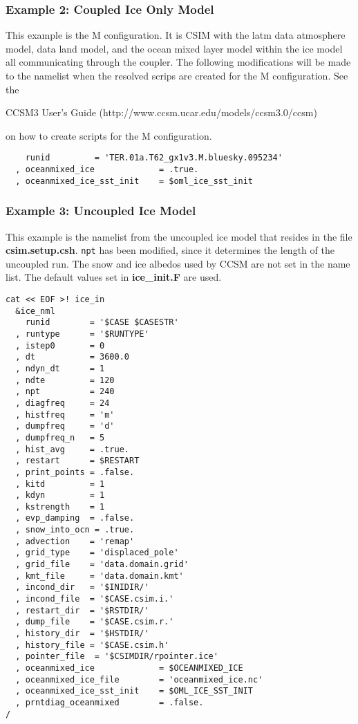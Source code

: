 \subsubsection {Example 2: Coupled Ice Only Model}
\label{example2_nml}

This example is the M configuration.  It is CSIM with the latm data
atmosphere model, data land model, and the ocean mixed layer model
within the ice model all communicating through the coupler.  The 
following modifications will be made to the namelist when the resolved
scrips are created for the M configuration.  See the 
\begin{htmlonly}
\end{htmlonly}
\begin{latexonly}
  CCSM3 User's Guide (http://www.ccsm.ucar.edu/models/ccsm3.0/ccsm)
\end{latexonly}
on how to create scripts for the M configuration.

\begin{verbatim}
    runid         = 'TER.01a.T62_gx1v3.M.bluesky.095234'
  , oceanmixed_ice             = .true.
  , oceanmixed_ice_sst_init    = $oml_ice_sst_init
\end{verbatim}

\subsubsection {Example 3: Uncoupled Ice Model}
\label{example3_nml}

This example is the namelist from the uncoupled ice model that resides
in the file {\bf csim.setup.csh}.  {\tt npt}  has been modified, since
it determines the length of the uncoupled run.  The snow and ice albedos
used by CCSM are not set in the name list. The default values set in
{\bf ice\_init.F} are used.  

\begin{verbatim}
cat << EOF >! ice_in
  &ice_nml
    runid        = '$CASE $CASESTR'
  , runtype      = '$RUNTYPE'
  , istep0       = 0
  , dt           = 3600.0
  , ndyn_dt      = 1
  , ndte         = 120
  , npt          = 240
  , diagfreq     = 24
  , histfreq     = 'm'
  , dumpfreq     = 'd'
  , dumpfreq_n   = 5
  , hist_avg     = .true.
  , restart      = $RESTART
  , print_points = .false.
  , kitd         = 1
  , kdyn         = 1
  , kstrength    = 1
  , evp_damping  = .false.
  , snow_into_ocn = .true.
  , advection    = 'remap'
  , grid_type    = 'displaced_pole'
  , grid_file    = 'data.domain.grid'
  , kmt_file     = 'data.domain.kmt'
  , incond_dir   = '$INIDIR/'
  , incond_file  = '$CASE.csim.i.'
  , restart_dir  = '$RSTDIR/'
  , dump_file    = '$CASE.csim.r.'
  , history_dir  = '$HSTDIR/'
  , history_file = '$CASE.csim.h'
  , pointer_file  = '$CSIMDIR/rpointer.ice'
  , oceanmixed_ice             = $OCEANMIXED_ICE
  , oceanmixed_ice_file        = 'oceanmixed_ice.nc'
  , oceanmixed_ice_sst_init    = $OML_ICE_SST_INIT
  , prntdiag_oceanmixed        = .false.
/
\end{verbatim}

